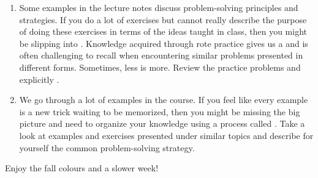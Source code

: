 \documentclass[../main.tex]{subfiles}
\begin{document}
\begin{enumerate}
    \item {} Some examples in the lecture notes discuss problem-solving principles and strategies. If you do a lot of exercises but cannot really describe the purpose of doing these exercises in terms of the ideas taught in class, then you might be slipping into . Knowledge acquired through rote practice gives us a  and is often challenging to recall when encountering similar problems presented in different forms. Sometimes, less is more. Review the practice problems and explicitly . 

    \item {} We go through a lot of examples in the course. If you feel like every example is a new trick waiting to be memorized, then you might be missing the big picture and need to organize your knowledge using a process called . Take a look at examples and exercises presented under similar topics and describe for yourself the common problem-solving strategy.
  \end{enumerate}


  \bigskip
  Enjoy the fall colours and a slower week! 
\end{document}
